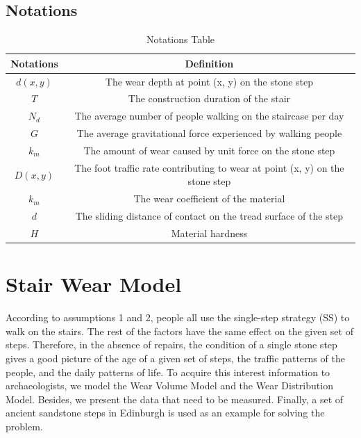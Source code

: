 \documentclass[12pt]{article}  %
\numberwithin{equation}{section} %
\begin{document}
\subsection{Notations}
\begin{table}[H]
\vspace{-2.0em}
	\centering
        \caption{Notations Table}
        \renewcommand{\arraystretch}{1.5}
        \setlength{\tabcolsep}{16pt}
	\begin{tabular}{cc}
		\hline
		\hline
		\multicolumn{1}{c}{\textbf{Notations}} & \textbf{Definition}\\ \hline
        $d(x,y)$                       & The wear depth at point (x, y) on the stone step\\
		$T$                      & The construction duration of the stair
\\
		$N_d$                      & The average number of people walking on the staircase per day\\
		$G$                       & The average gravitational force experienced by walking people\\
        $k_m$                       & The amount of wear caused by unit force on the stone step\\
        $D(x,y)$                       & The foot traffic rate contributing to wear at point (x, y) on the stone step\\
        $k_m$                       & The wear coefficient of the material\\
        $d$                       & The sliding distance of contact on the tread surface of the step\\
        $H$                       & Material hardness\\
        
    \hline
		\hline
	\end{tabular}
\end{table}


\section{Stair Wear Model}
According to assumptions 1 and 2, people all use the single-step strategy (SS) to walk on the stairs. The rest of the factors have the same effect on the given set of steps. Therefore, in the absence of repairs, the condition of a single stone step gives a good picture of the age of a given set of steps, the traffic patterns of the people, and the daily patterns of life.  To acquire this interest information to archaeologists, we model the  Wear Volume Model and the Wear Distribution Model. Besides, we present the data that need to be measured. Finally, a set of ancient sandstone steps in Edinburgh is used as an example for solving the problem.
\end{document}
